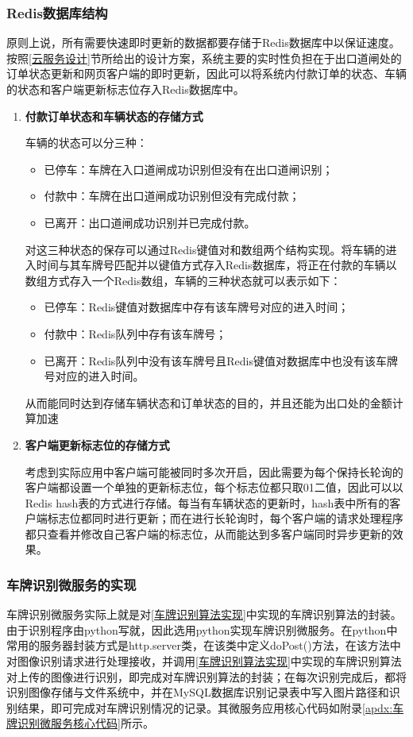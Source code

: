 \documentclass[a4paper]{ctexart}
\begin{document}
\subsubsection{Redis数据库结构}\label{Redis数据库结构}
原则上说，所有需要快速即时更新的数据都要存储于Redis数据库中以保证速度。按照\ref{云服务设计}节所给出的设计方案，系统主要的实时性负担在于出口道闸处的订单状态更新和网页客户端的即时更新，因此可以将系统内付款订单的状态、车辆的状态和客户端更新标志位存入Redis数据库中。
\begin{enumerate}[label=\bf{\arabic*、}]
	\item {\bf 付款订单状态和车辆状态的存储方式}
	
	      车辆的状态可以分三种：
	      \begin{itemize}
		      \item 已停车：车牌在入口道闸成功识别但没有在出口道闸识别；
		      \item 付款中：车牌在出口道闸成功识别但没有完成付款；
		      \item 已离开：出口道闸成功识别并已完成付款。
	      \end{itemize}

	      对这三种状态的保存可以通过Redis键值对和数组两个结构实现。将车辆的进入时间与其车牌号匹配并以键值方式存入Redis数据库，将正在付款的车辆以数组方式存入一个Redis数组，车辆的三种状态就可以表示如下：
	      \begin{itemize}
		      \item 已停车：Redis键值对数据库中存有该车牌号对应的进入时间；
		      \item 付款中：Redis队列中存有该车牌号；
		      \item 已离开：Redis队列中没有该车牌号且Redis键值对数据库中也没有该车牌号对应的进入时间。
	      \end{itemize}
	      从而能同时达到存储车辆状态和订单状态的目的，并且还能为出口处的金额计算加速

	\item {\bf 客户端更新标志位的存储方式}
	
	考虑到实际应用中客户端可能被同时多次开启，因此需要为每个保持长轮询的客户端都设置一个单独的更新标志位，每个标志位都只取01二值，因此可以以Redis hash表的方式进行存储。每当有车辆状态的更新时，hash表中所有的客户端标志位都同时进行更新；而在进行长轮询时，每个客户端的请求处理程序都只查看并修改自己客户端的标志位，从而能达到多客户端同时异步更新的效果。

\end{enumerate}

\subsubsection{车牌识别微服务的实现}
车牌识别微服务实际上就是对\ref{车牌识别算法实现}中实现的车牌识别算法的封装。由于识别程序由python写就，因此选用python实现车牌识别微服务。在python中常用的服务器封装方式是http.server类，在该类中定义doPost()方法，在该方法中对图像识别请求进行处理接收，并调用\ref{车牌识别算法实现}中实现的车牌识别算法对上传的图像进行识别，即完成对车牌识别算法的封装；在每次识别完成后，都将识别图像存储与文件系统中，并在MySQL数据库识别记录表中写入图片路径和识别结果，即可完成对车牌识别情况的记录。其微服务应用核心代码如附录\ref{apdx:车牌识别微服务核心代码}所示。
\end{document}
